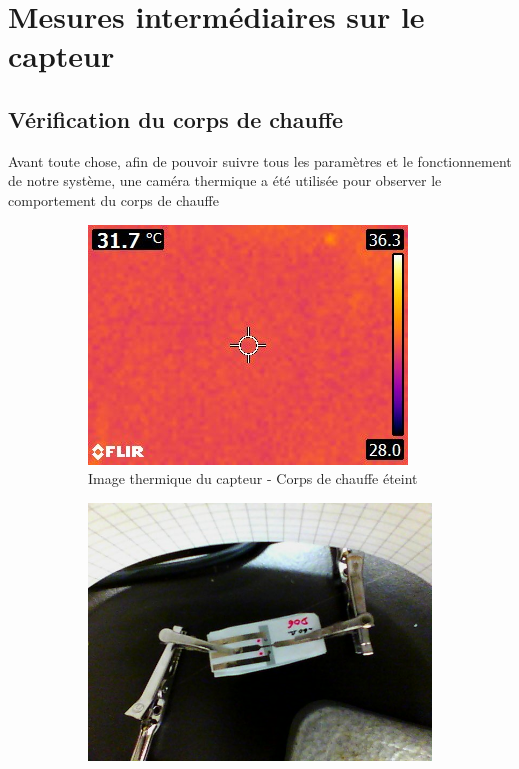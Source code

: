 \section{Mesures intermédiaires sur le capteur}
\label{chap:mesures}
\subsection{Vérification du corps de chauffe}
Avant toute chose, afin de pouvoir suivre tous les paramètres et le fonctionnement de notre système, une caméra thermique a été utilisée
pour observer le comportement du corps de chauffe

\begin{figure}[H]
    \begin{subfigure}[b]{0.3\textwidth}
        \hspace{-1 cm}
        \includegraphics[scale = 0.5]{assets/figures/thermique_sans_chauffe.jpg}
        \caption{Image thermique du capteur - Corps de chauffe éteint}
    \end{subfigure}
    \begin{subfigure}[b]{0.3\textwidth}
        \centering
        \includegraphics[scale = 0.23]{assets/figures/visuel_avec_chauffe.jpg}

\end{subfigure}
\end{figure}
